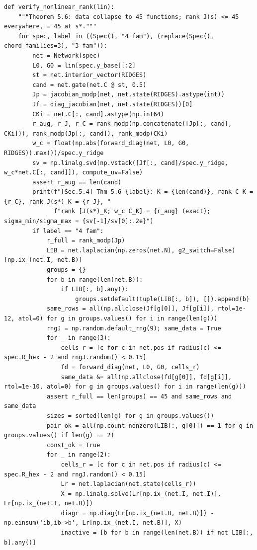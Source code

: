 \documentclass[11pt,a4paper]{article}
\theoremstyle{definition}
\theoremstyle{remark}
\begin{document}
\begin{lstlisting}
def verify_nonlinear_rank(lin):
    """Theorem 5.6: data collapse to 45 functions; rank J(s) <= 45 everywhere, = 45 at s*."""
    for spec, label in ((Spec(), "4 fam"), (replace(Spec(), chord_families=3), "3 fam")):
        net = Network(spec)
        L0, G0 = lin[spec.y_base][:2]
        st = net.interior_vector(RIDGES)
        cand = net.gate(net.C @ st, 0.5)
        Jp = jacobian_modp(net, net.state(RIDGES).astype(int))
        Jf = diag_jacobian(net, net.state(RIDGES))[0]
        CKi = net.C[:, cand].astype(np.int64)
        r_aug, r_J, r_C = rank_modp(np.concatenate([Jp[:, cand], CKi])), rank_modp(Jp[:, cand]), rank_modp(CKi)
        w_c = float(np.abs(forward_diag(net, L0, G0, RIDGES)).max())/spec.y_ridge
        sv = np.linalg.svd(np.vstack([Jf[:, cand]/spec.y_ridge, w_c*net.C[:, cand]]), compute_uv=False)
        assert r_aug == len(cand)
        print(f"[Sec.5.4] Thm 5.6 {label}: K = {len(cand)}, rank C_K = {r_C}, rank J(s*)_K = {r_J}, "
              f"rank [J(s*)_K; w_c C_K] = {r_aug} (exact); sigma_min/sigma_max = {sv[-1]/sv[0]:.2e}")
        if label == "4 fam":
            r_full = rank_modp(Jp)
            LIB = net.laplacian(np.zeros(net.N), g2_switch=False)[np.ix_(net.I, net.B)]
            groups = {}
            for b in range(len(net.B)):
                if LIB[:, b].any():
                    groups.setdefault(tuple(LIB[:, b]), []).append(b)
            same_rows = all(np.allclose(Jf[g[0]], Jf[g[i]], rtol=1e-12, atol=0) for g in groups.values() for i in range(len(g)))
            rngJ = np.random.default_rng(9); same_data = True
            for _ in range(3):
                cells_r = [c for c in net.pos if radius(c) <= spec.R_hex - 2 and rngJ.random() < 0.15]
                fd = forward_diag(net, L0, G0, cells_r)
                same_data &= all(np.allclose(fd[g[0]], fd[g[i]], rtol=1e-10, atol=0) for g in groups.values() for i in range(len(g)))
            assert r_full == len(groups) == 45 and same_rows and same_data
            sizes = sorted(len(g) for g in groups.values())
            pair_ok = all(np.count_nonzero(LIB[:, g[0]]) == 1 for g in groups.values() if len(g) == 2)
            const_ok = True
            for _ in range(2):
                cells_r = [c for c in net.pos if radius(c) <= spec.R_hex - 2 and rngJ.random() < 0.15]
                Lr = net.laplacian(net.state(cells_r))
                X = np.linalg.solve(Lr[np.ix_(net.I, net.I)], Lr[np.ix_(net.I, net.B)])
                diagr = np.diag(Lr[np.ix_(net.B, net.B)]) - np.einsum('ib,ib->b', Lr[np.ix_(net.I, net.B)], X)
                inactive = [b for b in range(len(net.B)) if not LIB[:, b].any()]

\end{lstlisting}
\end{document}
